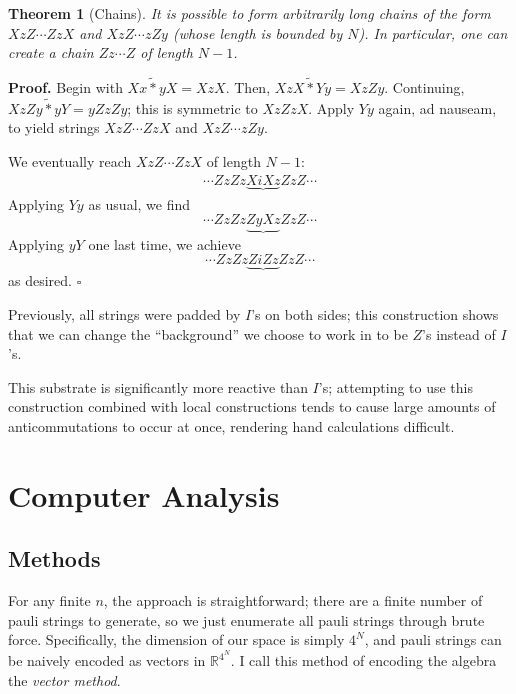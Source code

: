\documentclass[fleqn,12pt]{article}
\newcommand{\RR}{\mathbb{R}}
\newcommand{\ts}{\tilde{*}}
\newtheorem{theorem}{Theorem}
\newenvironment*{proof}{\begin{trivlist}\item[]{\bf Proof.}}{\hfill$\square$\end{trivlist}}
\begin{document}
\begin{theorem}
    [Chains]
    It is possible to form arbitrarily long chains of the form $XzZ\cdots ZzX$
    and $XzZ\cdots zZy$ (whose length is bounded by $N$).
    In particular, one can create a chain $Zz\cdots Z$ of length $N - 1$.
\end{theorem}
\begin{proof}
    Begin with $Xx \ts yX = XzX$. Then, $XzX \ts Yy = XzZy$.
    Continuing, $XzZy \ts yY = yZzZy$; this is symmetric to $XzZzX$.
    Apply $Yy$ again, ad nauseam, to yield strings $XzZ\cdots ZzX$
    and $XzZ\cdots zZy$.

    We eventually reach $XzZ\cdots ZzX$ of length $N - 1$:
    \begin{align*}
        \cdots ZzZz\underbrace{XiXz}ZzZ\cdots
    \end{align*}
    Applying $Yy$ as usual, we find
    \[
        \cdots ZzZz\underbrace{ZyXz}ZzZ\cdots
    \]
    Applying $yY$ one last time, we achieve
    \[
        \cdots ZzZz\underbrace{ZiZz}ZzZ\cdots
    \]
    as desired.
\end{proof}

Previously, all strings were padded by $I$'s on both sides;
this construction shows that we can change the ``background''
we choose to work in to be $Z$'s instead of $I$'s.

This substrate is significantly more reactive than $I$'s;
attempting to use this construction combined with local constructions
tends to cause large amounts of anticommutations to occur at once,
rendering hand calculations difficult.

\section{Computer Analysis}

\subsection{Methods}

For any finite $n$, the approach is straightforward; there are a finite
number of pauli strings to generate, so we just enumerate all pauli
strings through brute force. Specifically, the dimension of our space is
simply $4^N$, and pauli strings can be naively encoded as vectors in $\RR^{4^N}$.
I call this method of encoding the algebra
the \emph{vector method}.
\end{document}
